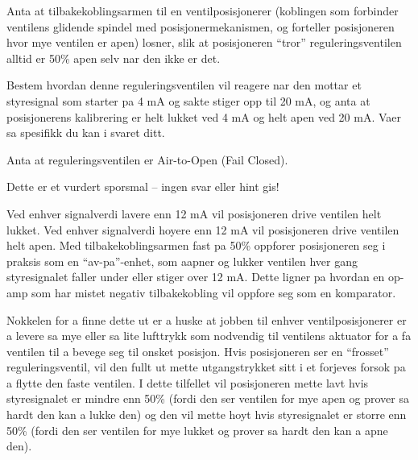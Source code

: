 

Anta at tilbakekoblingsarmen til en ventilposisjonerer (koblingen som forbinder ventilens glidende spindel med posisjonermekanismen, og forteller posisjoneren hvor mye ventilen er apen) losner, slik at posisjoneren ``tror'' reguleringsventilen alltid er 50\% apen selv nar den ikke er det.

\vskip 10pt

Bestem hvordan denne reguleringsventilen vil reagere nar den mottar et styresignal som starter pa 4 mA og sakte stiger opp til 20 mA, og anta at posisjonerens kalibrering er helt lukket ved 4 mA og helt apen ved 20 mA.  Vaer sa spesifikk du kan i svaret ditt.

\vskip 10pt

Anta at reguleringsventilen er Air-to-Open (Fail Closed).

\vfil

\eject






Dette er et vurdert sporsmal -- ingen svar eller hint gis!







Ved enhver signalverdi lavere enn 12 mA vil posisjoneren drive ventilen helt lukket.  Ved enhver signalverdi hoyere enn 12 mA vil posisjoneren drive ventilen helt apen.  Med tilbakekoblingsarmen fast pa 50\% oppforer posisjoneren seg i praksis som en ``av-pa''-enhet, som aapner og lukker ventilen hver gang styresignalet faller under eller stiger over 12 mA.  Dette ligner pa hvordan en op-amp som har mistet negativ tilbakekobling vil oppfore seg som en komparator.

\vskip 10pt

Nokkelen for a finne dette ut er a huske at jobben til enhver ventilposisjonerer er a levere sa mye eller sa lite lufttrykk som nodvendig til ventilens aktuator for a fa ventilen til a bevege seg til onsket posisjon.  Hvis posisjoneren ser en ``frosset'' reguleringsventil, vil den fullt ut mette utgangstrykket sitt i et forjeves forsok pa a flytte den faste ventilen.  I dette tilfellet vil posisjoneren mette lavt hvis styresignalet er mindre enn 50\% (fordi den ser ventilen for mye apen og prover sa hardt den kan a lukke den) og den vil mette hoyt hvis styresignalet er storre enn 50\% (fordi den ser ventilen for mye lukket og prover sa hardt den kan a apne den).





